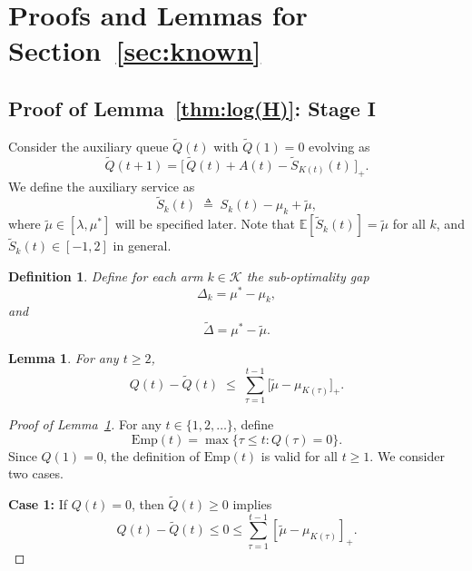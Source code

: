 \documentclass[12pt,draftcls, onecolumn]{IEEEtran}
\newtheorem{definition}{Definition}
\newtheorem{lemma}{Lemma}
\begin{document}
{\section{Proofs and Lemmas for Section~\ref{sec:known}}


\subsection{Proof of Lemma~\ref{thm:log(H)}: Stage I}
\label{sec:stageI}
Consider the auxiliary queue \(\widetilde{Q}(t)\) with \(\widetilde{Q}(1)=0\) evolving as
\[
\widetilde{Q}(t+1)
= \bigl[\,\widetilde{Q}(t) + A(t) - \widetilde{S}_{K(t)}(t)\,\bigr]_+.
\]
We define the auxiliary service as
\[
\widetilde{S}_k(t) \;\triangleq\; S_k(t) - \mu_k + \widetilde{\mu},
\]
where \(\widetilde{\mu}\in[\lambda,\mu^*]\) will be specified later. Note that \(\mathbb{E}[\widetilde{S}_k(t)] = \widetilde{\mu}\) for all \(k\), and \(\widetilde{S}_k(t)\in[-1,2]\) in general.


\begin{definition}
Define for each arm \(k\in\mathcal{K}\) the sub-optimality gap
\[
\Delta_k = \mu^* - \mu_k,
\]
and
\[
\tilde{\Delta} = \mu^* - \tilde{\mu}.
\]
\end{definition}


\begin{lemma}\label{lem:Q2sum}
For any \(t\ge2\),
\[
Q(t) - \widetilde{Q}(t)
\;\le\;
\sum_{\tau=1}^{t-1} \bigl[\widetilde{\mu} - \mu_{K(\tau)}\bigr]_+.
\]
\end{lemma}

\begin{proof}[Proof of Lemma~\ref{lem:Q2sum}]
For any \(t \in \{1,2,\ldots\}\), define
\[
\mathrm{Emp}(t) = \max\{\tau \le t : Q(\tau) = 0\}.
\]
Since \(Q(1)=0\), the definition of \(\mathrm{Emp}(t)\) is valid for all \(t\ge1\). We consider two cases.

 

\textbf{Case 1:} If \(Q(t)=0\), then \(\widetilde{Q}(t)\ge 0\) implies
\[
Q(t)-\widetilde{Q}(t)\le 0 \le \sum_{\tau=1}^{t-1} \left[\widetilde{\mu} - \mu_{K(\tau)}\right]_+.
\]

 


\end{proof}}
\end{document}
